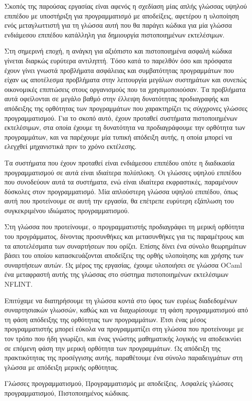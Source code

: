 \documentclass[diploma]{softlab-thesis}
\begin{document}
\begin{abstractgr}%
  Σκοπός της παρούσας εργασίας είναι αφενός η σχεδίαση μίας απλής
  γλώσσας υψηλού επιπέδου με υποστήριξη για προγραμματισμό με
  αποδείξεις, αφετέρου η υλοποίηση ενός μεταγλωττιστή για τη γλώσσα
  αυτή που θα παράγει κώδικα για μία γλώσσα ενδιάμεσου επιπέδου
  κατάλληλη για δημιουργία πιστοποιημένων εκτελέσιμων.

  Στη σημερινή εποχή, η ανάγκη για αξιόπιστο και πιστοποιημένα ασφαλή
  κώδικα γίνεται διαρκώς ευρύτερα αντιληπτή. Τόσο κατά το παρελθόν όσο
  και πρόσφατα έχουν γίνει γνωστά προβλήματα ασφάλειας και
  συμβατότητας προγραμμάτων που είχαν ως αποτέλεσμα προβλήματα στην
  λειτουργία μεγάλων συστημάτων και συνεπώς οικονομικές επιπτώσεις
  στους οργανισμούς που τα χρησιμοποιούσαν. Τα προβλήματα αυτά
  οφείλονται σε μεγάλο βαθμό στην έλλειψη δυνατότητας προδιαγραφής και
  απόδειξης της ορθότητας των προγραμμάτων που χαρακτηρίζει τις
  σύγχρονες γλώσσες προγραμματισμού. Για το σκοπό αυτό, έχουν προταθεί
  συστήματα πιστοποιημένων εκτελέσιμων, στα οποία έχουμε τη δυνατότητα
  να προδιαγράφουμε την ορθότητα των προγραμμάτων, και να παρέχουμε
  μία τυπική απόδειξη αυτής, η οποία μπορεί να ελεγχθεί μηχανιστικά
  πριν το χρόνο εκτέλεσης.

  Τα συστήματα που έχουν προταθεί είναι ενδιάμεσου επιπέδου οπότε η
  διαδικασία προγραμματισμού σε αυτά είναι ιδιαίτερα πολύπλοκη. Οι
  γλώσσες υψηλού επιπέδου που συνοδεύουν αυτά τα συστήματα, ενώ είναι
  ιδιαίτερα εκφραστικές, παραμένουν δύσκολες στον προγραμματισμό.  Μία
  απλούστερη γλώσσα υψηλού επιπέδου, όπως αυτή που προτείνουμε σε αυτή
  την εργασία, θα επέτρεπε ευρύτερη εξάπλωση του συγκεκριμένου
  ιδιώματος προγραμματισμού.

  Στη γλώσσα που προτείνουμε, ο προγραμματιστής προδιαγράφει τη μερική
  ορθότητα του προγράμματος, δίνοντας προσυνθήκες και μετασυνθήκες για
  τις παραμέτρους και τα αποτελέσματα των συναρτήσεων που ορίζει.
  Επίσης δίνει ένα σύνολο θεωρημάτων βάσει του οποίου κατασκευάζονται
  αποδείξεις της ορθής υλοποίησης και χρήσης των συναρτήσεων αυτών. Ως
  μέρος της εργασίας, έχουμε υλοποιήσει σε γλώσσα OCaml ένα
  μεταφραστή αυτής της γλώσσας στο σύστημα πιστοποιημένων
  εκτελέσιμων NFLINT.

  Επιτύχαμε να διατηρήσουμε τη γλώσσα κοντά στο ύφος των ευρέως
  διαδεδομένων συναρτησιακών γλωσσών, καθώς και να διαχωρίσουμε τη
  φάση προγραμματισμού από τη φάση απόδειξης της ορθότητας των
  προγραμμάτων. Έτσι ένας μέσος προγραμματιστής μπορεί εύκολα να
  προγραμματίζει στη γλώσσα που προτείνουμε με τον τρόπο που ήδη
  γνωρίζει, και ένας γνώστης μαθηματικής λογικής να αποδεικνύει σε
  επόμενη φάση την μερική ορθότητα των προγραμμάτων. Ως απόδειξη της
  πρακτικότητας της προσέγγισης αυτής, παραθέτουμε ένα σύνολο
  παραδειγμάτων στη γλώσσα με απόδειξη μερικής ορθότητας.
\begin{keywordsgr}
Γλώσσες προγραμματισμού, Προγραμματισμός με αποδείξεις, Ασφαλείς γλώσσες
προγραμματισμού, Πιστοποιημένος κώδικας.
\end{keywordsgr}
\end{abstractgr}
\end{document}

